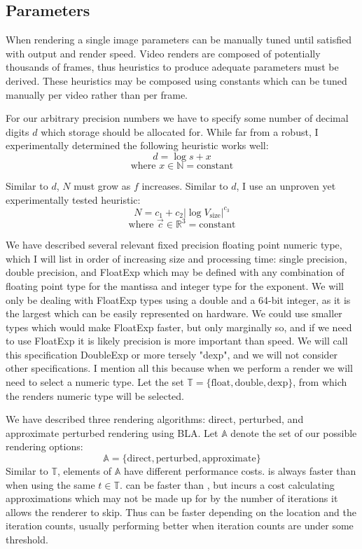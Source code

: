 \documentclass{article}
\begin{document}
\subsection{Parameters}
\par When rendering a single image parameters can be manually tuned until satisfied with output and render speed. Video renders are composed of potentially thousands of frames, thus heuristics to produce adequate parameters must be derived. These heuristics may be composed using constants which can be tuned manually per video rather than per frame.
\par For our arbitrary precision numbers we have to specify some number of decimal digits $d$ which storage should be allocated for. While far from a robust, I experimentally determined the following heuristic works well:
\[d = \log s + x\]
\[\text{where } x\in{\mathbb{N}} = \text{constant}\]
\par Similar to $d$, $N$ must grow as $f$ increases. Similar to $d$, I use an unproven yet experimentally tested heuristic:
\[ N = c_1+c_2 |\log{V_\text{size}}|^{c_3}\]
\[\text{where } \vec{c}\in{\mathbb{R}^3} = \text{constant}\]
\par We have described several relevant fixed precision floating point numeric type, which I will list in order of increasing size and processing time: single precision, double precision, and FloatExp which may be defined with any combination of floating point type for the mantissa and integer type for the exponent. We will only be dealing with FloatExp types using a double and a 64-bit integer, as it is the largest which can be easily represented on hardware. We could use smaller types which would make FloatExp faster, but only marginally so, and if we need to use FloatExp it is likely precision is more important than speed. We will call this specification DoubleExp or more tersely "dexp", and we will not consider other specifications. I mention all this because when we perform a render we will need to select a numeric type. Let the set $\mathbb{T}=\{\text{float}, \text{double}, \text{dexp}\}$, from which the renders numeric type will be selected.
\par We have described three rendering algorithms: direct, perturbed, and approximate perturbed rendering using BLA. Let $\mathbb{A}$ denote the set of our possible rendering options:
\[
    \mathbb{A} = \{\text{direct},\text{perturbed},\text{approximate}\}
\]
Similar to $\mathbb{T}$, elements of $\mathbb{A}$ have different performance costs.  is always faster than  when using the same $t\in\mathbb{T}$.  can be faster than , but incurs a cost calculating approximations which may not be made up for by the number of iterations it allows the renderer to skip. Thus  can be faster depending on the location and the iteration counts, usually performing better when iteration counts are under some threshold.
\end{document}
